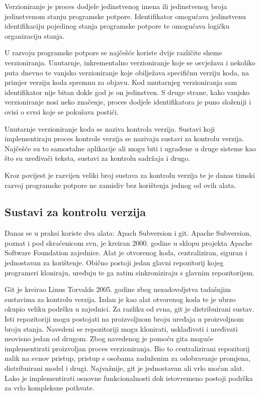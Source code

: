 \documentclass[times, utf8, diplomski, numeric]{fer}
\begin{document}
Verzioniranje je proces dodjele jedinstvenog imena ili jedinstvenog broja jedinstvenom stanju programske potpore\citep{wiki:SoftwareVersioning}. Identifikator omogućava jedinstvenu identifikaciju pojedinog stanja programske potpore te omogućava logičku organizaciju stanja.

U razvoju programske potpore se najčešće koriste dvije različite sheme verzioniranja. Unutarnje, inkrementalno verzioniranje koje se osvježava i nekoliko puta dnevno te vanjsko verzioniranje koje obilježava specifičnu verziju koda, na primjer verziju koda spremnu za objavu. Kod unutarnjeg verzioniranja sam identifikator nije bitan dokle god je on jedinstven. S druge strane, kako vanjsko verzioniranje nosi neko značenje, proces dodjele identifikatora je puno složeniji i ovisi o svrsi koje se pokušava postići.

Unutarnje verzioniranje koda se naziva kontrola verzija\citep{wiki:VersionControl}. Sustavi koji implementiraju proces kontrole verzija se nazivaju sustavi za kontrolu verzija. Najčešće su to samostalne aplikacije ali mogu biti i ugrađene u druge sisteme kao što su uređivači teksta, sustavi za kontrolu sadržaja i drugo.

Kroz povijest je razvijen veliki broj sustava za kontrolu verzija te je danas timski razvoj programske potpore ne zamisliv bez korištenja jednog od ovih alata.

\subsection{Sustavi za kontrolu verzija}

Danas se u praksi koriste dva alata: Apach Subversion i git. Apache Subversion, poznat i pod skraćenicom svn, je kreiran 2000. godine u sklopu projekta Apache Software Foundation zajednice. Alat je otvorenog koda, centraliziran, siguran i jednostavan za korištenje. Obično postoji jedan glavni repozitorij kojeg programeri kloniraju, uređuju te ga zatim sinkroniziraju s glavnim repozitorijem.

Git je kreirao Linus Torvalds 2005. godine zbog nezadovoljstva tadašnjim sustavima za kontrolu verzija. Izdan je kao alat otvorenog koda te je ubrzo okupio veliku podršku u zajednici. Za razliku od svna, git je distribuirani sustav. Isti repozitoriji mogu postojati na proizvoljnom broju uređaja u proizvoljnom broju stanja. Navedeni se repozitoriji mogu klonirati, usklađivati i uređivati neovisno jedan od drugom. Zbog navedenog je pomoću gita moguće implementirati proizvoljan proces verzioniranja. Bio to centralizirani repozitorij nalik na svnov pristup, pristup s osobama zaduženim za odobravanje promjena, distribuirani model i drugi. Najvažnije, git je jednostavan ali vrlo moćan alat. Lako je implementirati osnovne funkcionalnosti dok istovremeno postoji podrška za vrlo kompleksne pothvate.
\end{document}
